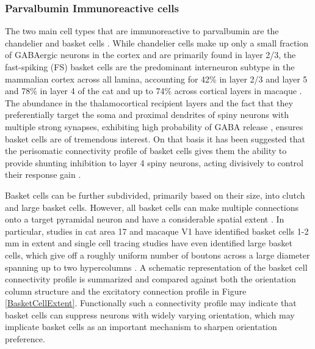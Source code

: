 \subsubsection{Parvalbumin Immunoreactive cells}

The two main cell types that are immunoreactive to parvalbumin
are the chandelier and basket cells \citep{Binzegger2004}. While
chandelier cells make up only a small fraction of GABAergic neurons in
the cortex and are primarily found in layer 2/3, the fast-spiking (FS)
basket cells are the predominant interneuron subtype in the mammalian
cortex across all lamina, accounting for 42\% in layer 2/3 and layer 5
and 78\% in layer 4 of the cat \citep{Hogan1992,Huxlin2001} and up to
74\% across cortical layers in macaque \citep{VanBrederode1990}. The
abundance in the thalamocortical recipient layers and the fact that
they preferentially target the soma and proximal dendrites of spiny
neurons with multiple strong synapses, exhibiting high probability of
GABA release \citep{Freund2007,Markram2004}, ensures basket cells are
of tremendous interest. On that basis it has been suggested that the
perisomatic connectivity profile of basket cells gives them the
ability to provide shunting inhibition to layer 4 spiny neurons,
acting divisively to control their response gain \citep{Wilson2012}.

Basket cells can be further subdivided, primarily based on their size,
into clutch and large basket cells. However, all basket cells can make
multiple connections onto a target pyramidal neuron
\citep{Somogyi1983} and have a considerable spatial extent
\citep{Kisvarday2002}. In particular, studies in cat area 17 and
macaque V1 have identified basket cells 1-2 mm in extent
\citep{Somogyi1983,Lund1987,Lund1991,Martin1983} and single cell
tracing studies have even identified large basket cells, which give
off a roughly uniform number of boutons across a large diameter
spanning up to two hypercolumns \citep{Buzas2001}. A schematic
representation of the basket cell connectivity profile is summarized
and compared against both the orientation column structure and the
excitatory connection profile in Figure
\ref{BasketCellExtent}. Functionally such a connectivity profile may
indicate that basket cells can suppress neurons with widely varying
orientation, which may implicate basket cells as an important
mechanism to sharpen orientation preference.

